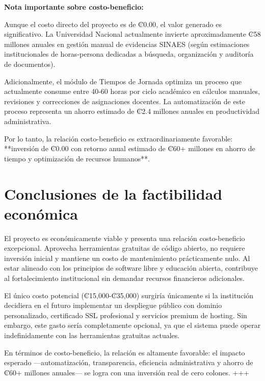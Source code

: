 \textbf{Nota importante sobre costo-beneficio:} 

Aunque el costo directo del proyecto es de ₡0.00, el valor generado es significativo. La Universidad Nacional actualmente invierte aproximadamente ₡58 millones anuales en gestión manual de evidencias SINAES (según estimaciones institucionales de horas-persona dedicadas a búsqueda, organización y auditoría de documentos). 

Adicionalmente, el módulo de Tiempos de Jornada optimiza un proceso que actualmente consume entre 40-60 horas por ciclo académico en cálculos manuales, revisiones y correcciones de asignaciones docentes. La automatización de este proceso representa un ahorro estimado de ₡2.4 millones anuales en productividad administrativa.

Por lo tanto, la relación costo-beneficio es extraordinariamente favorable: **inversión de ₡0.00 con retorno anual estimado de ₡60+ millones en ahorro de tiempo y optimización de recursos humanos**.

\section{Conclusiones de la factibilidad económica}
El proyecto es económicamente viable y presenta una relación costo-beneficio excepcional. 
Aprovecha herramientas gratuitas de código abierto, no requiere inversión inicial y mantiene un costo de mantenimiento prácticamente nulo. 
Al estar alineado con los principios de software libre y educación abierta, contribuye al fortalecimiento institucional sin demandar recursos financieros adicionales. 

El único costo potencial (₡15,000-₡35,000) surgiría únicamente si la institución decidiera en el futuro implementar un despliegue público con dominio personalizado, certificado SSL profesional y servicios premium de hosting. Sin embargo, este gasto sería completamente opcional, ya que el sistema puede operar indefinidamente con las herramientas gratuitas actuales.

En términos de costo-beneficio, la relación es altamente favorable: el impacto esperado —automatización, transparencia, eficiencia administrativa y ahorro de ₡60+ millones anuales— se logra con una inversión real de cero colones.
+++